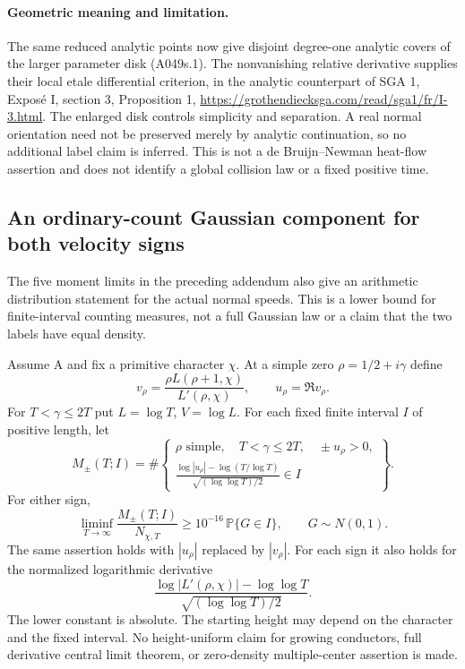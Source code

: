 \paragraph{Geometric meaning and limitation.}
The same reduced analytic points now give disjoint degree-one
analytic covers of the larger parameter disk (A049s.1).
The nonvanishing relative derivative supplies their local
etale differential criterion, in the analytic counterpart of
SGA 1, Expos\'e I, section 3, Proposition 1,
\url{https://grothendiecksga.com/read/sga1/fr/I-3.html}.
The enlarged disk controls simplicity and separation. A real
normal orientation need not be preserved merely by analytic
continuation, so no additional label claim is inferred.
This is not a de Bruijn--Newman heat-flow assertion and does
not identify a global collision law or a fixed positive time.


\subsection*{An ordinary-count Gaussian component for both velocity signs}

The five moment limits in the preceding addendum also give an
arithmetic distribution statement for the actual normal speeds.
This is a lower bound for finite-interval counting measures, not a
full Gaussian law or a claim that the two labels have equal density.

\begin{theorem}
\label{thm:A049-speed-gaussian-component}
Assume A and fix a primitive character $\chi$. At a simple zero
$\rho=1/2+i\gamma$ define
\[
 v_\rho=\frac{\rho L(\rho+1,\chi)}{L'(\rho,\chi)},\qquad
 u_\rho=\Re v_\rho.
\]
For $T<\gamma\le2T$ put $L=\log T$, $V=\log L$. For each
fixed finite interval $I$ of positive length, let
\[
 M_\pm(T;I)=\#\left\{\begin{array}{l}
 \rho\text{ simple},\quad T<\gamma\le2T,\quad \pm u_\rho>0,\\[1mm]
 \displaystyle
 \frac{\log|u_\rho|-\log(T/\log T)}{\sqrt{(\log\log T)/2}}\in I
 \end{array}\right\}.
\]
For either sign,
\[
 \liminf_{T\to\infty}\frac{M_\pm(T;I)}{N_{\chi,T}}
       \ge10^{-16}\,\mathbb P\{G\in I\},\qquad G\sim N(0,1).
\tag{A049v.1}
\]
The same assertion holds with $|u_\rho|$ replaced by $|v_\rho|$.
For each sign it also holds for the normalized logarithmic
derivative
\[
                 \frac{\log|L'(\rho,\chi)|-\log\log T}
                                      {\sqrt{(\log\log T)/2}}.
\tag{A049v.2}
\]
The lower constant is absolute. The starting height may depend
on the character and the fixed interval. No height-uniform claim
for growing conductors, full derivative central limit theorem,
or zero-density multiple-center assertion is made.
\end{theorem}

